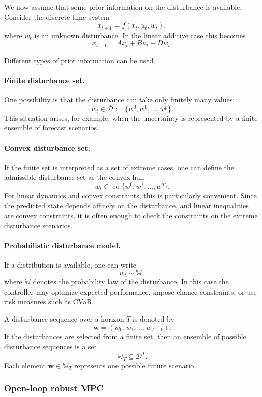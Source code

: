 We now assume that some prior information on the disturbance is available. Consider the
discrete-time system
\[
x_{t+1}=f(x_t,u_t,w_t),
\]
where $w_t$ is an unknown disturbance. In the linear additive case this becomes
\[
x_{t+1}=Ax_t+Bu_t+Dw_t.
\]

Different types of prior information can be used.

\paragraph{Finite disturbance set.}
One possibility is that the disturbance can take only finitely many values:
\[
w_t \in \mathcal D := \{w^0,w^1,\dots,w^p\}.
\]
This situation arises, for example, when the uncertainty is represented by a finite ensemble of
forecast scenarios.

\paragraph{Convex disturbance set.}
If the finite set is interpreted as a set of extreme cases, one can define the admissible
disturbance set as the convex hull
\[
w_t \in \operatorname{co}\{w^0,w^1,\dots,w^p\}.
\]
For linear dynamics and convex constraints, this is particularly convenient. Since the predicted
state depends affinely on the disturbance, and linear inequalities are convex constraints, it is
often enough to check the constraints on the extreme disturbance scenarios.

\paragraph{Probabilistic disturbance model.}
If a distribution is available, one can write
\[
w_t \sim \mathbb W,
\]
where $\mathbb W$ denotes the probability law of the disturbance. In this case the controller
may optimize expected performance, impose chance constraints, or use risk measures such as
CVaR.

A disturbance sequence over a horizon $T$ is denoted by
\[
\mathbf w = (w_0,w_1,\dots,w_{T-1}).
\]
If the disturbances are selected from a finite set, then an ensemble of possible disturbance
sequences is a set
\[
\mathbb W_T \subseteq \mathcal D^T.
\]
Each element $\mathbf w\in \mathbb W_T$ represents one possible future scenario.

\subsubsection{Open-loop robust MPC}

